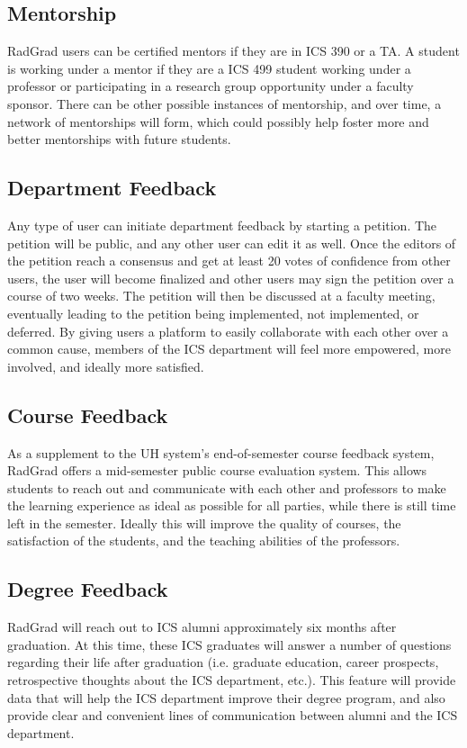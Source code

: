 \subsection{Mentorship}
RadGrad users can be certified mentors if they are in ICS 390 or a TA. A student is working under a mentor if they are a ICS 499 student working under a professor or participating in a research group opportunity under a faculty sponsor. There can be other possible instances of mentorship, and over time, a network of mentorships will form, which could possibly help foster more and better mentorships with future students.
\subsection{Department Feedback}
Any type of user can initiate department feedback by starting a petition. The petition will be public, and any other user can edit it as well. Once the editors of the petition reach a consensus and get at least 20 votes of confidence from other users, the user will become finalized and other users may sign the petition over a course of two weeks. The petition will then be discussed at a faculty meeting, eventually leading to the petition being implemented, not implemented, or deferred. By giving users a platform to easily collaborate with each other over a common cause, members of the ICS department will feel more empowered, more involved, and ideally more satisfied.
\subsection{Course Feedback}
As a supplement to the UH system's end-of-semester course feedback system, RadGrad offers a mid-semester public course evaluation system. This allows students to reach out and communicate with each other and professors to make the learning experience as ideal as possible for all parties, while there is still time left in the semester. Ideally this will improve the quality of courses, the satisfaction of the students, and the teaching abilities of the professors. 
\subsection{Degree Feedback}
RadGrad will reach out to ICS alumni approximately six months after graduation. At this time, these ICS graduates will answer a number of questions regarding their life after graduation (i.e. graduate education, career prospects, retrospective thoughts about the ICS department, etc.). This feature will provide data that will help the ICS department improve their degree program, and also provide clear and convenient lines of communication between alumni and the ICS department. 
